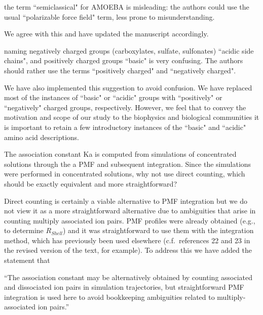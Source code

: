 \documentclass[answers,12pt]{exam}
\begin{document}
\begin{questions}
    \question the term ``semiclassical" for AMOEBA is misleading: the authors could use the usual ``polarizable force field" term, less prone to misunderstanding.
    \begin{solution}
    We agree with this and have updated the manuscript accordingly. 
    \end{solution}

    \question naming negatively charged groups (carboxylates, sulfate, sulfonates) ``acidic side chains", and positively charged groups ``basic" is very confusing. The authors should rather use the terms ``positively charged" and ``negatively charged".
    \begin{solution}
    We have also implemented this suggestion to avoid confusion. We have replaced most of the instances of ``basic" or ``acidic" groups with ``positively" or ``negatively" charged groups, respectively. However, we feel that to convey the motivation and scope of our study to the biophysics and biological communities it is important to retain a few introductory instances of the ``basic" and ``acidic" amino acid descriptions. 
    \end{solution}
 
    \question The association constant Ka is computed from simulations of concentrated solutions through the a PMF and subsequent integration. Since the simulations were performed in concentrated solutions, why not use direct counting, which should be exactly equivalent and more straightforward? 
    \begin{solution}
    Direct counting is certainly a viable alternative to PMF integration but we do not view it as a more straightforward alternative due to ambiguities that arise in counting multiply associated ion pairs. PMF profiles were already obtained (e.g., to determine $R_{Shell}$) and it was straightforward to use them with the integration method, which has previously been used elsewhere (c.f.~references 22 and 23 in the revised version of the text, for example). To address this we have added the statement that 
    
    ``The association constant may be alternatively obtained by counting associated and dissociated ion pairs in simulation trajectories, but straightforward PMF integration is used here to avoid bookkeeping ambiguities related to multiply-associated ion pairs.'' 
    \end{solution}
    

\end{questions}
\end{document}
